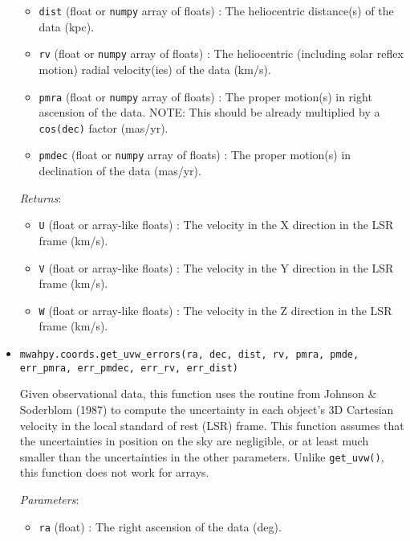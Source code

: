 \documentclass{article}
\begin{document}
\begin{itemize}
\begin{itemize}
\item \verb!dist! (float or \verb!numpy! array of floats) : The heliocentric distance(s) of the data (kpc).

\item \verb!rv! (float or \verb!numpy! array of floats) : The heliocentric (including solar reflex motion) radial velocity(ies) of the data (km/s).

\item \verb!pmra! (float or \verb!numpy! array of floats) : The proper motion(s) in right ascension of the data. NOTE: This should be already multiplied by a \verb!cos(dec)! factor (mas/yr). 

\item \verb!pmdec! (float or \verb!numpy! array of floats) : The proper motion(s) in declination of the data (mas/yr).

\end{itemize}

\textit{Returns}: \begin{itemize}

\item \verb!U! (float or array-like floats) : The velocity in the X direction in the LSR frame (km/s).

\item \verb!V! (float or array-like floats) : The velocity in the Y direction in the LSR frame (km/s).

\item \verb!W! (float or array-like floats) : The velocity in the Z direction in the LSR frame (km/s).

\end{itemize}



\item \verb!mwahpy.coords.get_uvw_errors(ra, dec, dist, rv, pmra, pmde, err_pmra, err_pmdec, err_rv, err_dist)!

Given observational data, this function uses the routine from Johnson \& Soderblom (1987) to compute the uncertainty in each object's 3D Cartesian velocity in the local standard of rest (LSR) frame. This function assumes that the uncertainties in position on the sky are negligible, or at least much smaller than the uncertainties in the other parameters. Unlike \verb!get_uvw()!, this function does not work for arrays.

\textit{Parameters}: \begin{itemize}

\item \verb!ra! (float) : The right ascension of the data (deg).


\end{itemize}
\end{itemize}
\end{document}
